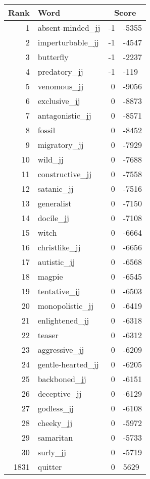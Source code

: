 \begin{longtable}[!htbp]{| rlr@{.}l |}
    \hline
    \textbf{Rank} & \textbf{Word} & \multicolumn{2}{c|}{\textbf{Score}} \\
    \hline
    \endhead
    1 & absent-minded\_jj & -1 & -5355 \\
    2 & imperturbable\_jj & -1 & -4547 \\
    3 & butterfly & -1 & -2237 \\
    4 & predatory\_jj & -1 & -119 \\
    5 & venomous\_jj & 0 & -9056 \\
    6 & exclusive\_jj & 0 & -8873 \\
    7 & antagonistic\_jj & 0 & -8571 \\
    8 & fossil & 0 & -8452 \\
    9 & migratory\_jj & 0 & -7929 \\
    10 & wild\_jj & 0 & -7688 \\
    11 & constructive\_jj & 0 & -7558 \\
    12 & satanic\_jj & 0 & -7516 \\
    13 & generalist & 0 & -7150 \\
    14 & docile\_jj & 0 & -7108 \\
    15 & witch & 0 & -6664 \\
    16 & christlike\_jj & 0 & -6656 \\
    17 & autistic\_jj & 0 & -6568 \\
    18 & magpie & 0 & -6545 \\
    19 & tentative\_jj & 0 & -6503 \\
    20 & monopolistic\_jj & 0 & -6419 \\
    21 & enlightened\_jj & 0 & -6318 \\
    22 & teaser & 0 & -6312 \\
    23 & aggressive\_jj & 0 & -6209 \\
    24 & gentle-hearted\_jj & 0 & -6205 \\
    25 & backboned\_jj & 0 & -6151 \\
    26 & deceptive\_jj & 0 & -6129 \\
    27 & godless\_jj & 0 & -6108 \\
    28 & cheeky\_jj & 0 & -5972 \\
    29 & samaritan & 0 & -5733 \\
    30 & surly\_jj & 0 & -5719 \\
    1831 & quitter & 0 & 5629 \\

\end{longtable}
